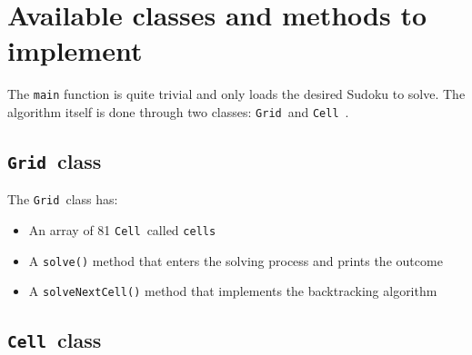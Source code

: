 \documentclass{ecnreport}
\begin{document}
\newpage
\section{Available classes and methods to implement}

\def\Grid{\texttt{Grid}~}
\def\Cell{\texttt{Cell}~}

The \texttt{main} function is quite trivial and only loads the desired Sudoku to solve. The algorithm itself is done through two classes: \Grid and \Cell.

\subsection{\Grid class}

The \Grid class has:
\begin{itemize}
 \item An array of 81 \Cell called \texttt{cells}
 \item A \texttt{solve()} method that enters the solving process and prints the outcome
 \item A \texttt{solveNextCell()} method that implements the backtracking algorithm
\end{itemize}


\subsection{\Cell class}
\end{document}
